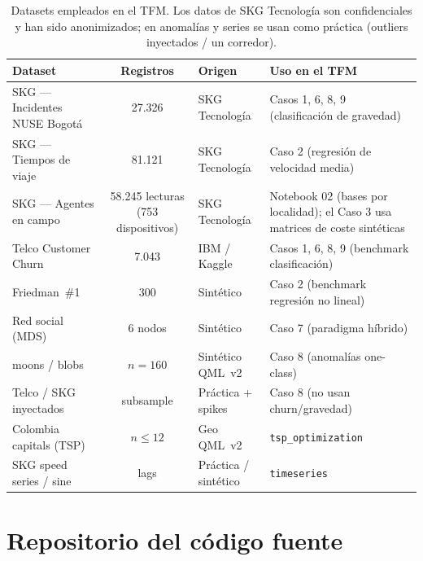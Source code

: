 \begin{table}[ht]
\centering
\footnotesize
\setlength{\tabcolsep}{5pt}
\renewcommand{\arraystretch}{1.2}
\begin{tabularx}{\linewidth}{@{}>{\raggedright\arraybackslash}p{3.2cm} c >{\raggedright\arraybackslash}p{2.4cm} >{\raggedright\arraybackslash}X@{}}
\toprule
\textbf{Dataset} & \textbf{Registros} & \textbf{Origen} & \textbf{Uso en el TFM} \\
\midrule
SKG — Incidentes NUSE Bogotá & 27.326 & SKG Tecnología & Casos 1, 6, 8, 9 (clasificación de gravedad) \\[3pt]
SKG — Tiempos de viaje & 81.121 & SKG Tecnología & Caso 2 (regresión de velocidad media) \\[3pt]
SKG — Agentes en campo & 58.245 lecturas (753 dispositivos) & SKG Tecnología & Notebook 02 (bases por localidad); el Caso 3 usa matrices de coste sintéticas \\[3pt]
Telco Customer Churn & 7.043 & IBM / Kaggle & Casos 1, 6, 8, 9 (benchmark clasificación) \\[3pt]
Friedman~\#1 & 300 & Sintético & Caso 2 (benchmark regresión no lineal) \\[3pt]
Red social (MDS) & 6 nodos & Sintético & Caso 7 (paradigma híbrido) \\[3pt]
moons / blobs & $n=160$ & Sintético QML~v2 & Caso 8 (anomalías one-class) \\[3pt]
Telco / SKG inyectados & subsample & Práctica + spikes & Caso 8 (no usan churn/gravedad) \\[3pt]
Colombia capitals (TSP) & $n\leq 12$ & Geo QML~v2 & \texttt{tsp\_optimization} \\[3pt]
SKG speed series / sine & lags & Práctica / sintético & \texttt{timeseries} \\
\bottomrule
\end{tabularx}
\caption{Datasets empleados en el TFM. Los datos de SKG Tecnología son confidenciales y han sido anonimizados; en anomalías y series se usan como práctica (outliers inyectados / un corredor).}
\label{tab:datasets}
\end{table}

\section{Repositorio del código fuente}
\label{anx:repositorio}

